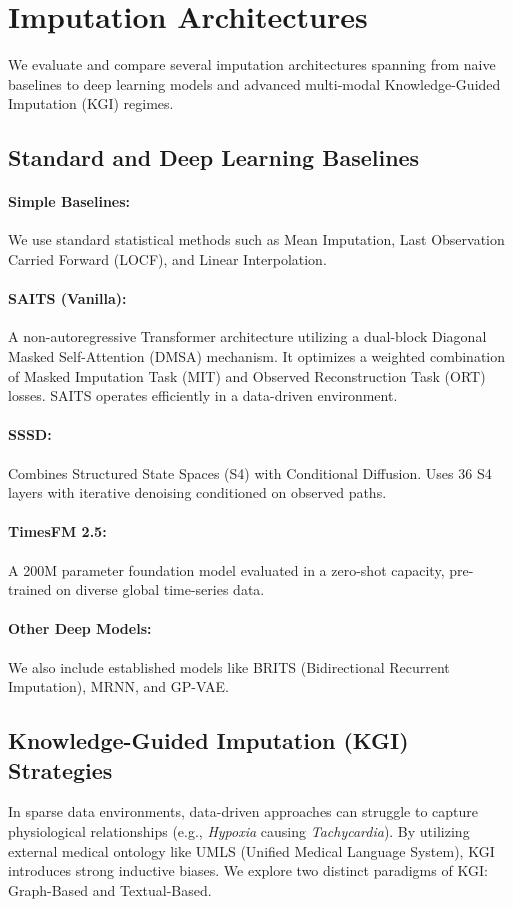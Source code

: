 \section{Imputation Architectures}

We evaluate and compare several imputation architectures spanning from naive baselines to deep learning models and advanced multi-modal Knowledge-Guided Imputation (KGI) regimes.

\subsection{Standard and Deep Learning Baselines}
\paragraph{Simple Baselines:} We use standard statistical methods such as Mean Imputation, Last Observation Carried Forward (LOCF), and Linear Interpolation.
\paragraph{SAITS (Vanilla):} A non-autoregressive Transformer architecture utilizing a dual-block Diagonal Masked Self-Attention (DMSA) mechanism. It optimizes a weighted combination of Masked Imputation Task (MIT) and Observed Reconstruction Task (ORT) losses. SAITS operates efficiently in a data-driven environment.
\paragraph{SSSD:} Combines Structured State Spaces (S4) with Conditional Diffusion. Uses 36 S4 layers with iterative denoising conditioned on observed paths.
\paragraph{TimesFM 2.5:} A 200M parameter foundation model evaluated in a zero-shot capacity, pre-trained on diverse global time-series data.
\paragraph{Other Deep Models:} We also include established models like BRITS (Bidirectional Recurrent Imputation), MRNN, and GP-VAE.

\subsection{Knowledge-Guided Imputation (KGI) Strategies}
In sparse data environments, data-driven approaches can struggle to capture physiological relationships (e.g., \textit{Hypoxia} causing \textit{Tachycardia}). By utilizing external medical ontology like UMLS (Unified Medical Language System), KGI introduces strong inductive biases. We explore two distinct paradigms of KGI: Graph-Based and Textual-Based.

